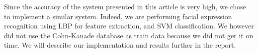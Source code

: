\noindent Since the accuracy of the system presented in this article is very high, we chose to implement a similar system. Indeed, we are performing facial expression recognition using LBP for feature extraction, and SVM classification. We however did not use the Cohn-Kanade database as train data because we did not get it on time. We will describe our implementation and results further in the report. 
\newline

